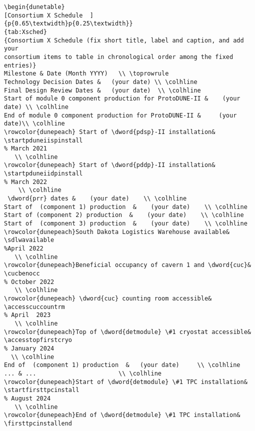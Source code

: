 \begin{verbatim}
\begin{dunetable}
[Consortium X Schedule  ]
{p{0.65\textwidth}p{0.25\textwidth}}
{tab:Xsched}
{Consortium X Schedule (fix short title, label and caption, and add your 
consortium items to table in chronological order among the fixed entries)}   
Milestone & Date (Month YYYY)   \\ \toprowrule
Technology Decision Dates &   (your date) \\ \colhline
Final Design Review Dates &   (your date)  \\ \colhline
Start of module 0 component production for ProtoDUNE-II &    (your date) \\ \colhline
End of module 0 component production for ProtoDUNE-II &     (your date)\\ \colhline
\rowcolor{dunepeach} Start of \dword{pdsp}-II installation&  \startpduneiispinstall   
% March 2021 
   \\ \colhline
\rowcolor{dunepeach} Start of \dword{pddp}-II installation& \startpduneiidpinstall  
% March 2022 
    \\ \colhline
 \dword{prr} dates &    (your date)    \\ \colhline
Start of  (component 1) production  &    (your date)    \\ \colhline
Start of (component 2) production  &    (your date)    \\ \colhline
Start of  (component 3) production  &    (your date)    \\ \colhline
\rowcolor{dunepeach}South Dakota Logistics Warehouse available& \sdlwavailable   
%April 2022 
   \\ \colhline
\rowcolor{dunepeach}Beneficial occupancy of cavern 1 and \dword{cuc}& \cucbenocc   
% October 2022 
   \\ \colhline
\rowcolor{dunepeach} \dword{cuc} counting room accessible& \accesscuccountrm   
% April  2023 
   \\ \colhline
\rowcolor{dunepeach}Top of \dword{detmodule} \#1 cryostat accessible& \accesstopfirstcryo  
% January 2024
  \\ \colhline
End of  (component 1) production  &   (your date)     \\ \colhline
... & ...                       \\ \colhline
\rowcolor{dunepeach}Start of \dword{detmodule} \#1 TPC installation& \startfirsttpcinstall  
% August 2024 
   \\ \colhline
\rowcolor{dunepeach}End of \dword{detmodule} \#1 TPC installation& \firsttpcinstallend  

\end{verbatim}
